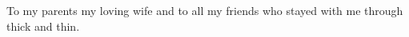 \vspace{-20 mm}
To my parents my loving wife and to all my friends who stayed with me through thick and thin.\\
